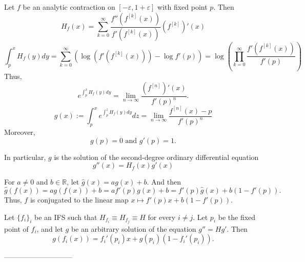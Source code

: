 \documentclass[12pt,]{article}
\theoremstyle{definition}
\theoremstyle{remark}
\renewcommand{\Bbb}[1]{\mathbb{#1}}
\newcommand{\bbR}{{\Bbb R}}        %
\newcommand{\0}{\mathbf{0}}
\begin{document}
Let $f$ be an analytic contraction on $[-\varepsilon,1+\varepsilon]$ with fixed point $p$. Then
\[
H_f(x)=\sum_{k=0}^\infty\frac{f''(f^{[k]}(x))}{f'(f^{[k]}(x))}(f^{[k]})'(x)
\]
\[
\int_p^x H_f(y)dy=\sum_{k=0}^\infty\left(\log\left(f'(f^{[k]}(x))\right)-\log f'(p)\right)=\log\left(\prod_{k=0}^\infty\frac{f'(f^{[k]}(x))}{f'(p)}\right)
\]
Thus,
\[
e^{\int_p^x H_f(y)dy}=\lim_{n\to\infty}\frac{(f^{[n]})'(x)}{f'(p)^n}.
\]
\[
g(x):=\int_p^xe^{\int_p^z H_f(y)dy}dz=\lim_{n\to\infty}\frac{f^{[n]}(x)-p}{f'(p)^n}
\]
Moreover,
\[
g(p)=0\text{ and }g'(p)=1.
\]

In particular, $g$ is the solution of the second-degree ordinary differential equation
\[
g''(x)=H_f(x)g'(x)
\]

For $a\neq0$ and $b\in\bbR$, let $\hat{g}(x)=ag(x)+b$. And then
\[
\hat{g}(f(x))=ag(f(x))+b=af'(p) g(x)+b=f'(p)\hat{g}(x)+b(1-f'(p)).
\]
Thus, $f$ is conjugated to the linear map $x\mapsto f'(p)x+b(1-f'(p))$.

Let $\{f_i\}_{i}$ be an IFS such that $H_{f_i}\equiv H_{f_j}\equiv H$ for every $i\neq j$. Let $p_i$ be the fixed point of $f_i$, and let
$g$ be an arbitrary solution of the equation $g''=Hg'$. Then
$$
g(f_i(x))=f_i'(p_i)x+g(p_i)(1-f_i'(p_i)).
$$

-----------------------------
\end{document}
